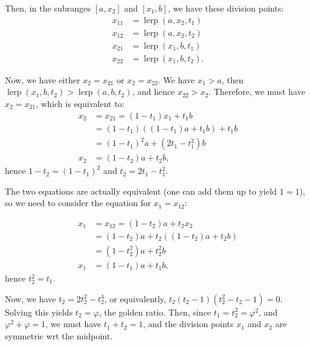 Then, in the subranges \( [a, x_{2}] \) and \( [x_{1}, b] \), we have these
division points:
\begin{align*}
  x_{11} &= \operatorname{lerp}(a, x_{2}, t_{1}) \\
  x_{12} &= \operatorname{lerp}(a, x_{2}, t_{2}) \\
  x_{21} &= \operatorname{lerp}(x_{1}, b, t_{1}) \\
  x_{22} &= \operatorname{lerp}(x_{1}, b, t_{2})
.\end{align*}

Now, we have either \( x_{2} = x_{21} \) or \( x_{2} = x_{22} \). We have \(
x_{1} > a \), then \( \operatorname{lerp}(x_{1}, b, t_{2}) >
\operatorname{lerp}(a, b, t_{2}) \), and hence \( x_{22} > x_{2} \). Therefore,
we must have \( x_{2} = x_{21} \), which is equivalent to:
\begin{align*}
  x_{2} &= x_{21} = (1 - t_{1})x_{1} + t_{1}b\\
  &= (1 - t_{1})((1 - t_{1})a + t_{1}b) + t_{1}b \\
  &= (1 - t_{1})^2 a + (2t_{1} - t_{1}^2)b \\
  x_{2} &= (1 - t_{2})a + t_{2}b
,\end{align*}hence \( 1 - t_{2} = (1 - t_{1})^2 \) and \( t_{2} = 2t_{1} -
t_{1}^2 \).

The two equations are actually equivalent (one can add them up to yield \( 1 = 1
\)), so we need to consider the equation for \( x_{1} = x_{12} \):

\begin{align*}
  x_{1} &= x_{12} = (1 - t_{2})a + t_{2}x_{2} \\
  &= (1-t_{2})a + t_{2}((1-t_{2})a + t_{2}b) \\
  &= (1 - t_{2}^2)a + t_{2}^2b \\
  x_{1} &= (1 - t_{1})a + t_{1}b
,\end{align*}hence \( t_{2}^2 = t_{1}\).

Now, we have \( t_{2} = 2t_{2}^2 - t_{2}^{4} \), or equivalently, \( t_{2}(t_{2}
- 1)(t_{2}^2 -t_{2} - 1) = 0 \). Solving this yields \( t_{2} = \varphi \), the
golden ratio. Then, since \( t_{1} = t_{2}^2 = \varphi ^2 \), and \( \varphi ^2
+ \varphi = 1\), we must have \( t_{1} + t_{2} = 1 \), and the division points
\( x_{1} \) and \( x_{2} \) are symmetric wrt the midpoint.

